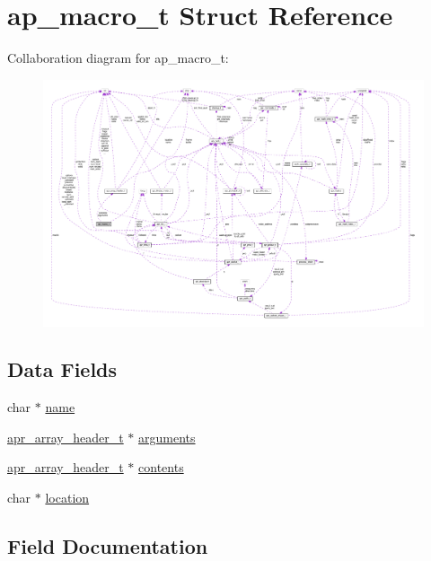 \hypertarget{structap__macro__t}{}\section{ap\+\_\+macro\+\_\+t Struct Reference}
\label{structap__macro__t}


Collaboration diagram for ap\+\_\+macro\+\_\+t\+:
\nopagebreak
\begin{figure}[H]
\begin{center}
\leavevmode
\includegraphics[width=350pt]{structap__macro__t__coll__graph}
\end{center}
\end{figure}
\subsection*{Data Fields}
\begin{DoxyCompactItemize}
\item 
char $\ast$ \hyperlink{structap__macro__t_adfc21f30470f6c40efb9c1e56a44d616}{name}
\item 
\hyperlink{structapr__array__header__t}{apr\+\_\+array\+\_\+header\+\_\+t} $\ast$ \hyperlink{structap__macro__t_a6002514892f6a7d816dcc8c8660b565c}{arguments}
\item 
\hyperlink{structapr__array__header__t}{apr\+\_\+array\+\_\+header\+\_\+t} $\ast$ \hyperlink{structap__macro__t_ab0fe3f2dd4f4f1befed600809b42f6db}{contents}
\item 
char $\ast$ \hyperlink{structap__macro__t_a36304c1afc541b41450c47e04b4b5a23}{location}
\end{DoxyCompactItemize}


\subsection{Field Documentation}
